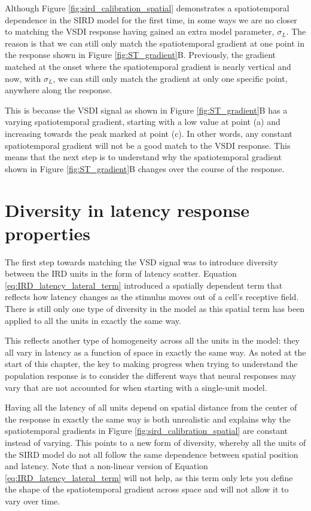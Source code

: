 \documentclass[phd,ianc,twoside]{infthesis}
\begin{document}
Although Figure \ref{fig:sird_calibration_spatial} demonstrates a
spatiotemporal dependence in the SIRD model for the first time, in some
ways we are no closer to matching the VSDI response having gained an
extra model parameter, $\sigma_L$. The reason is that we can still only
match the spatiotemporal gradient at one point in the response shown in
Figure \ref{fig:ST_gradient}B. Previously, the gradient matched at the
onset where the spatiotemporal gradient is nearly vertical and now, with
$\sigma_L$, we can still only match the gradient at only one specific
point, anywhere along the response.

This is because the VSDI signal as shown in Figure
\ref{fig:ST_gradient}B has a varying spatiotemporal gradient, starting
with a low value at point (a) and increasing towards the peak marked at
point (c). In other words, any constant spatiotemporal gradient will not
be a good match to the VSDI response. This means that the next step is
to understand why the spatiotemporal gradient shown in Figure
\ref{fig:ST_gradient}B changes over the course of the response.


\section{Diversity in latency response properties}

The first step towards matching the VSD signal was to introduce
diversity between the IRD units in the form of latency scatter. Equation
\ref{eq:IRD_latency_lateral_term} introduced a spatially dependent term
that reflects how latency changes as the stimulus moves out of a cell's
receptive field. There is still only one type of diversity in the model
as this spatial term has been applied to all the units in exactly the
same way.

This reflects another type of homogeneity across all the units in the
model: they all vary in latency as a function of space in exactly the
same way. As noted at the start of this chapter, the key to making
progress when trying to understand the population response is to
consider the different ways that neural responses may vary that are not
accounted for when starting with a single-unit model.

Having all the latency of all units depend on spatial distance from the
center of the response in exactly the same way is both unrealistic and
explains why the spatiotemporal gradients in Figure
\ref{fig:sird_calibration_spatial} are constant instead of varying. This
points to a new form of diversity, whereby all the units of the SIRD
model do not all follow the same dependence between spatial position and
latency. Note that a non-linear version of Equation
\ref{eq:IRD_latency_lateral_term} will not help, as this term only lets you
define the shape of the spatiotemporal gradient across space and will not
allow it to vary over time.
\end{document}
